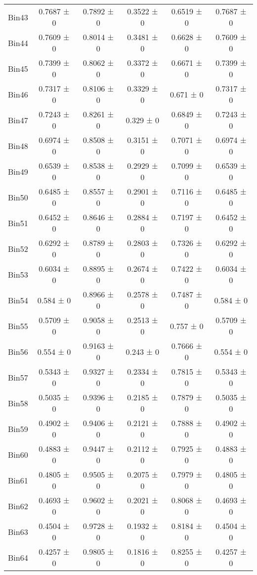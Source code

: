 \begin{tabular}{@{\extracolsep{4pt}}lccccc@{}}
     Bin43 & 0.7687 ± 0 & 0.7892 ± 0 & 0.3522 ± 0 & 0.6519 ± 0 & 0.7687 ± 0 \\ 
     Bin44 & 0.7609 ± 0 & 0.8014 ± 0 & 0.3481 ± 0 & 0.6628 ± 0 & 0.7609 ± 0 \\ 
     Bin45 & 0.7399 ± 0 & 0.8062 ± 0 & 0.3372 ± 0 & 0.6671 ± 0 & 0.7399 ± 0 \\ 
     Bin46 & 0.7317 ± 0 & 0.8106 ± 0 & 0.3329 ± 0 & 0.671 ± 0 & 0.7317 ± 0 \\ 
     Bin47 & 0.7243 ± 0 & 0.8261 ± 0 & 0.329 ± 0 & 0.6849 ± 0 & 0.7243 ± 0 \\ 
     Bin48 & 0.6974 ± 0 & 0.8508 ± 0 & 0.3151 ± 0 & 0.7071 ± 0 & 0.6974 ± 0 \\ 
     Bin49 & 0.6539 ± 0 & 0.8538 ± 0 & 0.2929 ± 0 & 0.7099 ± 0 & 0.6539 ± 0 \\ 
     Bin50 & 0.6485 ± 0 & 0.8557 ± 0 & 0.2901 ± 0 & 0.7116 ± 0 & 0.6485 ± 0 \\ 
     Bin51 & 0.6452 ± 0 & 0.8646 ± 0 & 0.2884 ± 0 & 0.7197 ± 0 & 0.6452 ± 0 \\ 
     Bin52 & 0.6292 ± 0 & 0.8789 ± 0 & 0.2803 ± 0 & 0.7326 ± 0 & 0.6292 ± 0 \\ 
     Bin53 & 0.6034 ± 0 & 0.8895 ± 0 & 0.2674 ± 0 & 0.7422 ± 0 & 0.6034 ± 0 \\ 
     Bin54 & 0.584 ± 0 & 0.8966 ± 0 & 0.2578 ± 0 & 0.7487 ± 0 & 0.584 ± 0 \\ 
     Bin55 & 0.5709 ± 0 & 0.9058 ± 0 & 0.2513 ± 0 & 0.757 ± 0 & 0.5709 ± 0 \\ 
     Bin56 & 0.554 ± 0 & 0.9163 ± 0 & 0.243 ± 0 & 0.7666 ± 0 & 0.554 ± 0 \\ 
     Bin57 & 0.5343 ± 0 & 0.9327 ± 0 & 0.2334 ± 0 & 0.7815 ± 0 & 0.5343 ± 0 \\ 
     Bin58 & 0.5035 ± 0 & 0.9396 ± 0 & 0.2185 ± 0 & 0.7879 ± 0 & 0.5035 ± 0 \\ 
     Bin59 & 0.4902 ± 0 & 0.9406 ± 0 & 0.2121 ± 0 & 0.7888 ± 0 & 0.4902 ± 0 \\ 
     Bin60 & 0.4883 ± 0 & 0.9447 ± 0 & 0.2112 ± 0 & 0.7925 ± 0 & 0.4883 ± 0 \\ 
     Bin61 & 0.4805 ± 0 & 0.9505 ± 0 & 0.2075 ± 0 & 0.7979 ± 0 & 0.4805 ± 0 \\ 
     Bin62 & 0.4693 ± 0 & 0.9602 ± 0 & 0.2021 ± 0 & 0.8068 ± 0 & 0.4693 ± 0 \\ 
     Bin63 & 0.4504 ± 0 & 0.9728 ± 0 & 0.1932 ± 0 & 0.8184 ± 0 & 0.4504 ± 0 \\ 
     Bin64 & 0.4257 ± 0 & 0.9805 ± 0 & 0.1816 ± 0 & 0.8255 ± 0 & 0.4257 ± 0 \\ 

\end{tabular}
